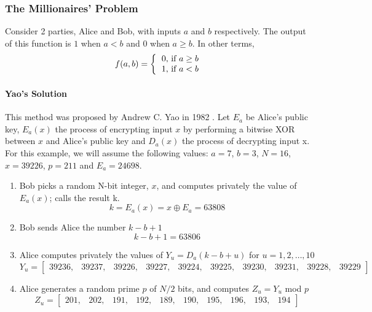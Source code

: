 \begin{refsection}
\subsubsection{The Millionaires' Problem}
Consider 2 parties, Alice and Bob, with inputs $a$ and $b$ respectively. The output of this function is $1$ when $a < b$
and $0$ when $a \geq b$. In other terms,
\[
f(a,b) = \left \{
          \begin{tabular}{ccc}
          0, if $a \geq b$ \\
          1, if $a < b$
          \end{tabular}
        \right.
\]
\paragraph{Yao's Solution}
This method was proposed by Andrew C. Yao in 1982 \cite{yao1982}. Let $E_a$ be Alice's public key, $E_a(x)$ the process of encrypting input $x$ by performing
a bitwise XOR between $x$ and Alice's public key and $D_a(x)$ the process of decrypting input x.
For this example, we will assume the following values: $a = 7$, $b = 3$, $N = 16$, $x = 39226$, $p = 211$ and $E_a = 24698$.

\begin{enumerate}
\item Bob picks a random N-bit integer, $x$, and computes privately the value of $E_a(x)$; calls the result k.
\begin{equation}\label{eq:encryptingX}
k = E_a(x) = x \oplus E_a = 63808
\end{equation}

\item Bob sends Alice the number $k - b + 1$
\begin{equation}\label{eq:encryptingX}
k - b + 1 = 63806
\end{equation}

\item Alice computes privately the values of $Y_u = D_a(k - b + u)$ for $u = 1,2,\ldots,10$\\
\[
Y_u = \begin{bmatrix}
        39236,&39237,&39226,&39227,&39224,&39225,&39230,&39231,&39228,&39229
      \end{bmatrix}
\]

\item Alice generates a random prime $p$ of $N/2$ bits, and computes $Z_u = Y_u$  mod  $p$
\[
Z_u = \begin{bmatrix}
        201,&202,&191,&192,&189,&190,&195,&196,&193,&194
      \end{bmatrix}
\]


\end{enumerate}
\end{refsection}
